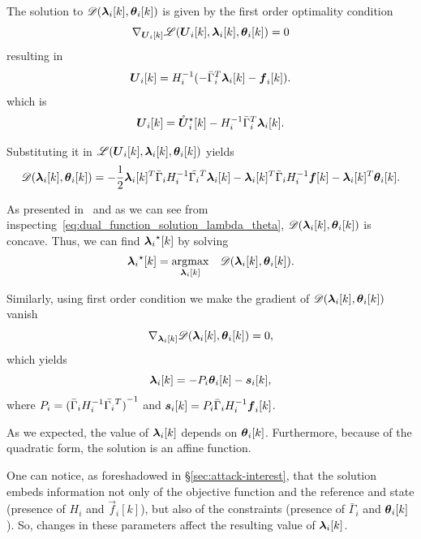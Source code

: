 \documentclass[../main.tex]{subfiles}
\begin{document}
The solution to $\dualfunction$ is given by the first order \KKT{} optimality condition
\begin{equation}
\nabla_{\vec{U}_{i}[k]}\lagrangian=0
\end{equation}
resulting in
\begin{equation}
\vec{U}_{i}[k]=H_{i}^{-1}(-\bar{\Gamma}_{i}^{T}\lambdaik-\vec{f}_{i}[k]).
\end{equation}
which is
\begin{equation}
\vec{U}_{i}[k]=\optuncUik-H_{i}^{-1}\bar{\Gamma}_{i}^{T}\lambdaik.
\end{equation}

Substituting it in $\lagrangian$ yields
\begin{equation}
  \label{eq:dual_function_solution_lambda_theta}
\dualfunction=-\frac{1}{2}\lambdaik^{T}\linearcoefi\lambdaik-\lambdaik^{T}\bar{\Gamma}_{i}H_{i}^{-1}\vec{f}[k]-\lambdaik^{T}\thetaik.
\end{equation}

As presented in~\cite{BoydVandenberghe2004} and as we can see from inspecting~\eqref{eq:dual_function_solution_lambda_theta}, $\dualfunction$ is concave. Thus, we can find $\lambdaikstar$ by solving
\begin{equation}
  \label{eq:eq_lambda_equation}
  \begin{matrix}
    \lambdaikstar=\argmax\limits_{\lambdaik}&\dualfunction.
  \end{matrix}
\end{equation}

Similarly, using first order \KKT{} condition we make the gradient of $\dualfunction$ vanish
\begin{equation}
\nabla_{\lambdaik}\dualfunction=0,
\end{equation}
which yields
\begin{equation}
  \label{eq:lambda_function_theta}
  \lambdaik=-\Plin\thetaik-\sik,
\end{equation}
where ${P}_{i}={(\bar{\Gamma}_{i}H_{i}^{-1}\bar{\Gamma_{i}}^{T})}^{-1}$ and $\boldsymbol{s}_{i}[k]={P}_{i}\bar{\Gamma}_{i}H_{i}^{-1}\boldsymbol{f}_{i}[k]$.

As we expected, the value of $\lambdaik$ depends on $\thetaik$.
Furthermore, because of the quadratic form, the solution is an affine function.

\begin{remark}
  One can notice, as foreshadowed in \S\ref{sec:attack-interest}, that the solution embeds information not only of the objective function and the reference and state (presence of $H_{i}$ and $\vec{f}_{i}[k]$), but also of the constraints (presence of $\bar{\Gamma}_{i}$ and $\thetaik$).
  So, changes in these parameters affect the resulting value of $\lambdaik$.
\end{remark}
\end{document}
